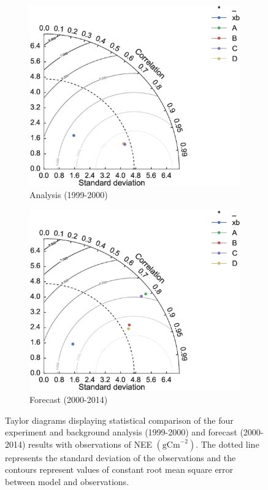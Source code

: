 \documentclass[11pt]{article}
\begin{document}
\begin{figure}[ht]
    \centering
    \begin{subfigure}[b]{0.49\textwidth}
        \includegraphics[width=\textwidth]{tdcvt_a.eps}
        \caption{Analysis (1999-2000)}
        \label{fig:td_a}
    \end{subfigure}
    \begin{subfigure}[b]{0.49\textwidth}
        \includegraphics[width=\textwidth]{tdcvt_f.eps}
        \caption{Forecast (2000-2014)}
        \label{fig:td_f}
    \end{subfigure}
    \caption{Taylor diagrams displaying statistical comparison of the four experiment and background analysis (1999-2000) and forecast (2000-2014) results with observations of NEE $( \text{gCm}^{-2})$. The dotted line represents the standard deviation of the observations and the contours represent values of constant root mean square error between model and observations.}
    \label{fig:taylordiag}
\end{figure}
\end{document}
